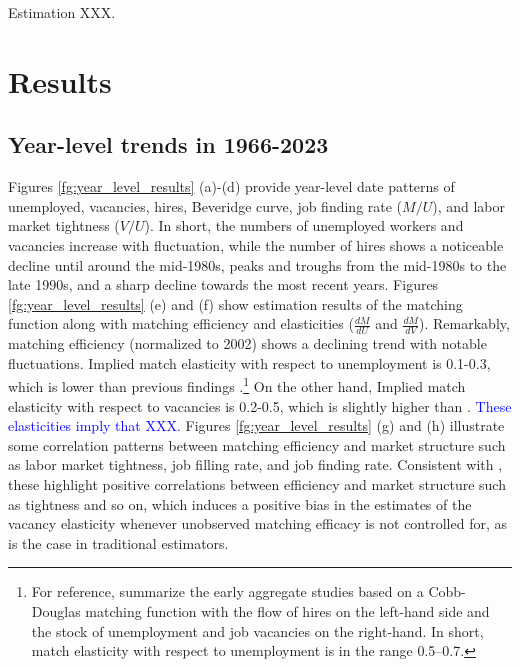 \documentclass[12pt]{article}
\begin{document}
Estimation XXX.



\section{Results}

\subsection{Year-level trends in 1966-2023}



Figures \ref{fg:year_level_results} (a)-(d) provide year-level date patterns of unemployed, vacancies, hires, Beveridge curve, job finding rate ($M/U$), and labor market tightness ($V/U$). 
In short, the numbers of unemployed workers and vacancies increase with fluctuation, while the number of hires shows a noticeable decline until around the mid-1980s, peaks and troughs from the mid-1980s to the late 1990s, and a sharp decline towards the most recent years.
Figures \ref{fg:year_level_results} (e) and (f) show estimation results of the matching function along with matching efficiency and elasticities ($\frac{dM}{dU}$ and $\frac{dM}{dV}$).
Remarkably, matching efficiency (normalized to 2002) shows a declining trend with notable fluctuations.
Implied match elasticity with respect to unemployment is 0.1-0.3, which is lower than previous findings \citep{petrongolo2001looking}.\footnote{For reference, \cite{petrongolo2001looking} summarize the early aggregate studies based on a Cobb-Douglas matching function with the flow of hires on the left-hand side and the stock of unemployment and job vacancies on the right-hand. In short, match elasticity with respect to unemployment is in the range 0.5–0.7.} 
On the other hand, Implied match elasticity with respect to vacancies is 0.2-0.5, which is slightly higher than \cite{lange2020beyond}.
\textcolor{blue}{These elasticities imply that XXX.}
Figures \ref{fg:year_level_results} (g) and (h) illustrate some correlation patterns between matching efficiency and market structure such as labor market tightness, job filling rate, and job finding rate.
Consistent with \cite{lange2020beyond}, these highlight positive correlations between efficiency and market structure such as tightness and so on, which induces a positive bias in the estimates of the vacancy elasticity whenever unobserved matching efficacy is not controlled for, as is the case in traditional estimators.
\end{document}
